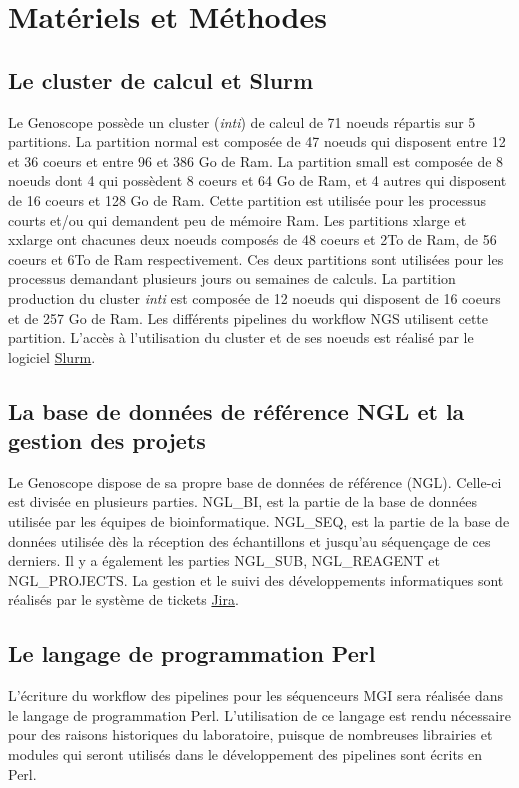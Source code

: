 \section{Matériels et Méthodes}
\subsection{Le cluster de calcul et Slurm}
Le Genoscope possède un cluster (\emph{inti}) de calcul de 71 noeuds répartis sur 5 partitions. La partition \og normal\fg{} est composée de 47 noeuds qui disposent entre 12 et 36 coeurs et entre 96 et 386 Go de Ram. La partition \og small\fg{} est composée de 8 noeuds dont 4 qui possèdent 8 coeurs et 64 Go de Ram, et 4 autres qui disposent de 16 coeurs et 128 Go de Ram. Cette partition est utilisée pour les processus courts et/ou qui demandent peu de mémoire Ram. Les partitions \og xlarge \fg{} et \og xxlarge\fg{} ont chacunes deux noeuds composés de 48 coeurs et 2To de Ram, de 56 coeurs et 6To de Ram respectivement. Ces deux partitions sont utilisées pour les processus demandant plusieurs jours ou semaines de calculs.
La partition \og production\fg{} du cluster \emph{inti} est composée de 12 noeuds qui disposent de 16 coeurs et de 257 Go de Ram. Les différents pipelines du workflow NGS utilisent cette partition.
L'accès à l'utilisation du cluster et de ses noeuds est réalisé par le logiciel \href{https://slurm.schedmd.com/documentation.html}{Slurm}.

\subsection{La base de données de référence NGL et la gestion des projets}
Le Genoscope dispose de sa propre base de données de référence (NGL). Celle-ci est divisée en plusieurs parties. NGL\_BI, est la partie de la base de données utilisée par les équipes de bioinformatique. NGL\_SEQ, est la partie de la base de données utilisée dès la réception des échantillons et jusqu'au séquençage de ces derniers. Il y a également les parties NGL\_SUB, NGL\_REAGENT et NGL\_PROJECTS. La gestion et le suivi des développements informatiques sont réalisés par le système de tickets \href{https://www.atlassian.com/fr/software/jira}{Jira}.

\subsection{Le langage de programmation Perl}
L'écriture du workflow des pipelines pour les séquenceurs MGI sera réalisée dans le langage de programmation Perl. L'utilisation de ce langage est rendu nécessaire pour des raisons historiques du laboratoire, puisque de nombreuses librairies et modules qui seront utilisés dans le développement des pipelines sont écrits en Perl.\\


